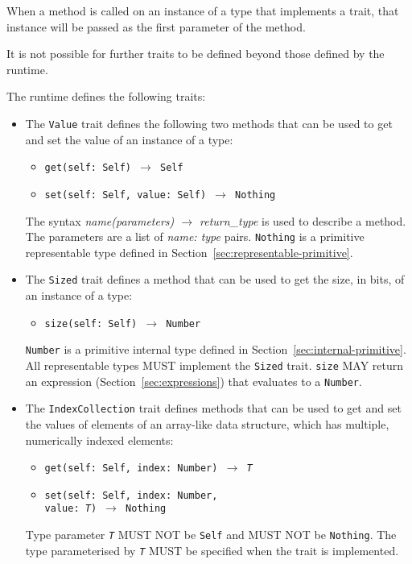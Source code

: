 \documentclass[10pt,twocolumn,a4paper]{article}
\newcommand{\code}[1]{\texttt{#1}}
\begin{document}
When a method is called on an instance of a type that implements a trait,
that instance will be passed as the first parameter of the method.

It is not possible for further traits to be defined beyond those defined by the
runtime.

The runtime defines the following traits:
\begin{itemize}
  \item The \code{Value} trait defines the following two methods that can
    be used to get and set the value of an instance of a type:
    \begin{itemize}
      \item \texttt{get(self: Self) $\rightarrow$ Self}
      \item \texttt{set(self: Self, value: Self) $\rightarrow$ Nothing}
    \end{itemize}
    The syntax \emph{name(parameters) $\rightarrow$ return\_type} is used to
    describe a method. The parameters are a list of \emph{name: type}
    pairs. \code{Nothing} is a primitive representable type defined in
    Section~\ref{sec:representable-primitive}.

  \item The \code{Sized} trait defines a method that can be used to get the
    size, in bits, of an instance of a type:
    \begin{itemize}
      \item \texttt{size(self: Self) $\rightarrow$ Number}
    \end{itemize}
    \code{Number} is a primitive internal type defined in
    Section~\ref{sec:internal-primitive}.
    All representable types MUST implement the \code{Sized} trait.
    \code{size} MAY return an expression (Section~\ref{sec:expressions}) that
    evaluates to a \code{Number}.

  \item The \code{IndexCollection} trait defines methods that can be used
    to get and set the values of elements of an array-like data structure,
    which has multiple, numerically indexed elements:
    \begin{itemize}
      \item \texttt{get(self: Self, index: Number) $\rightarrow$ \emph{T}}
      \item \texttt{set(self: Self, index: Number,\\\hspace*{0.75cm}value: \emph{T}) $\rightarrow$ Nothing}
    \end{itemize}
    Type parameter \texttt{\emph{T}} MUST NOT be \code{Self} and MUST NOT be
    \code{Nothing}. The type parameterised by \texttt{\emph{T}} MUST be
    specified when the trait is implemented.


\end{itemize}
\end{document}
